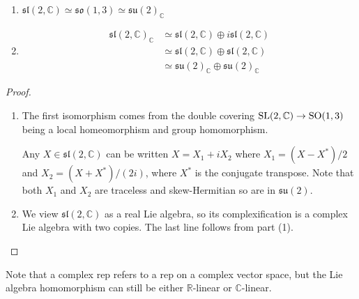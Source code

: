 \begin{prop}
	\begin{enumerate}[(1)]
	    \item 
	$\mathfrak{sl}(2,\mathbb{C}) \simeq \mathfrak{so}(1,3)
	\simeq\mathfrak{su}(2)_{\mathbb{C}}$
		\item \phantom{}\vspace{-1.0cm}
	\begin{align*}
		\mathfrak{sl}(2,\mathbb{C})_{\mathbb{C}}
		&\simeq \mathfrak{sl}(2,\mathbb{C})\oplus i\mathfrak{sl}(2,\mathbb{C})\\
		&\simeq \mathfrak{sl}(2,\mathbb{C})\oplus \mathfrak{sl}(2,\mathbb{C}) \\
		&\simeq \mathfrak{su}(2)_{\mathbb{C}} \oplus \mathfrak{su}(2)_{\mathbb{C}}
	\end{align*}
	\end{enumerate}
\end{prop}
\begin{proof}
	\begin{enumerate}[(1)]
	    \item 
	The first isomorphism comes from the double covering $\operatorname{SL}(2,\mathbb{C}) \to
	\operatorname{SO}(1,3)$ being a local homeomorphism and group homomorphism.

	Any $X\in \mathfrak{sl}(2,\mathbb{C})$ can be written $X = X_1 + iX_2$ where
	$X_1= (X-X^*) /2$ and $X_2= (X+X^*) /(2i)$, where $X^*$ is the conjugate
	transpose. Note that both $X_1$ and $X_2$ are traceless and skew-Hermitian
	so are in $\mathfrak{su}(2)$.
		\item 
	We view $\mathfrak{sl}(2,\mathbb{C})$ as a real Lie algebra, so its
	complexification is a complex Lie algebra with two copies. 
	The last line follows from part (1).
	\end{enumerate}
\end{proof}
 
Note that a complex rep refers to a rep on a complex
vector space, but the Lie algebra homomorphism can still be either
$\mathbb{R}$-linear or $\mathbb{C}$-linear. 

